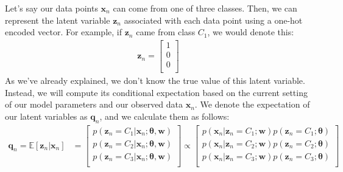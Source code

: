 Let's say our data points $\textbf{x}_n$ can come from one of three classes. Then, we can represent the latent variable $\textbf{z}_n$ associated with each data point using a one-hot encoded vector. For example, if $\textbf{z}_n$ came from class $C_1$, we would denote this:
\begin{align*}
    \textbf{z}_n = 
        \begin{bmatrix}
            1 \\
            0 \\
            0 \\
        \end{bmatrix}
\end{align*}
As we've already explained, we don't know the true value of this latent variable. Instead, we will compute its conditional expectation based on the current setting of our model parameters and our observed data $\textbf{x}_n$. We denote the expectation of our latent variables as $\textbf{q}_n$, and we calculate them as follows:
\begin{align*}
    \textbf{q}_n = \mathbb{E}[\textbf{z}_n | \textbf{x}_n] &= \begin{bmatrix}
            p(\textbf{z}_n = C_1 | \textbf{x}_n; \boldsymbol{\theta}, \textbf{w}) \\
            p(\textbf{z}_n = C_2 | \textbf{x}_n; \boldsymbol{\theta}, \textbf{w}) \\
            p(\textbf{z}_n = C_3 | \textbf{x}_n; \boldsymbol{\theta}, \textbf{w}) \\
        \end{bmatrix} 
        \propto \begin{bmatrix}
            p(\textbf{x}_n | \textbf{z}_n = C_1; \textbf{w})p(\textbf{z}_n = C_1; \boldsymbol{\theta}) \\
            p(\textbf{x}_n | \textbf{z}_n = C_2; \textbf{w})p(\textbf{z}_n = C_2; \boldsymbol{\theta}) \\
            p(\textbf{x}_n | \textbf{z}_n = C_3; \textbf{w})p(\textbf{z}_n = C_3; \boldsymbol{\theta}) \\
        \end{bmatrix} \\
\end{align*}

